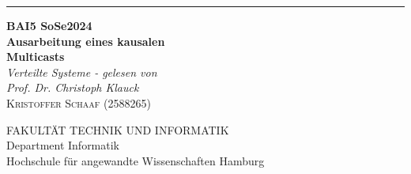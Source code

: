 \begin{titlepage} %
	
\raggedleft %
	
\rule{1pt}{\textheight} %
\hspace{0.05\textwidth} %
\parbox[b]{0.75\textwidth}{ %
		
	{\Huge\bfseries BAI5 SoSe2024 \\[0.5\baselineskip] Ausarbeitung eines kausalen \\Multicasts}\\[2\baselineskip] %
	{\large\textit{Verteilte Systeme - gelesen von\\Prof. Dr. Christoph Klauck}}\\[4\baselineskip] %
	{\Large\textsc{Kristoffer Schaaf (2588265)}} %
		
	\vspace{0.5\textheight} %
		
	{\noindent FAKULTÄT TECHNIK UND INFORMATIK\\Department Informatik\\Hochschule für angewandte Wissenschaften Hamburg}\\[\baselineskip] %
}

\end{titlepage}